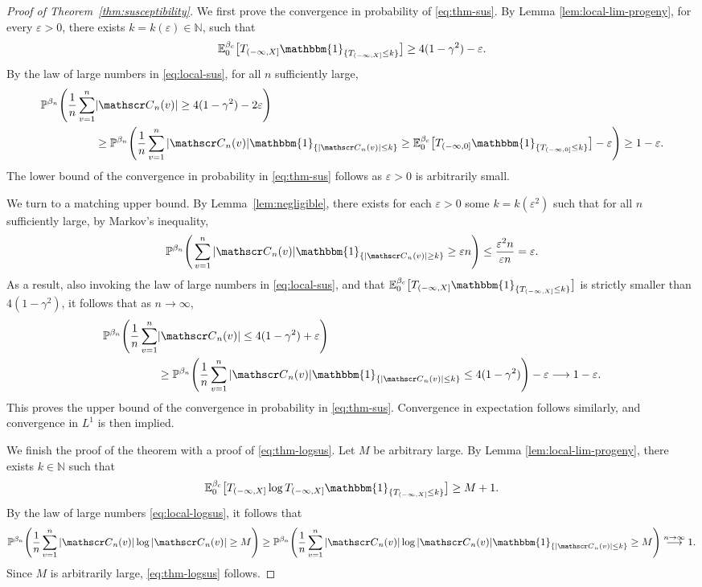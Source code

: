 \documentclass[a4paper, a4wide, 10pt, reqno]{amsart}
\theoremstyle{plain}
\theoremstyle{definition}
\numberwithin{equation}{section}
\newcommand{\N}{{\mathbb N}}
\newcommand{\E}{\mathbb E}
\newcommand{\Prob}{\mathbb{P}}
\newcommand{\sC}{{\mathscr C}}
\newcommand{\ind}[1]{\mathbbm{1}_{\{#1\}}}
\begin{document}
\begin{proof}[Proof of  Theorem~\ref{thm:susceptibility}]
 We first prove the convergence in probability of \eqref{eq:thm-sus}.
 By Lemma \ref{lem:local-lim-progeny},  for every $\varepsilon>0$, there exists $k=k(\varepsilon)\in\N$, such that 
\[
\E^{\beta_c}_{0}\big[T_{(-\infty, X]}\ind{T_{(-\infty, X]}\le k}\big] \ge 4(1-\gamma^2) -\varepsilon.
\]
By the law of large numbers in \eqref{eq:local-sus}, for all $n$ sufficiently large, 
\[
\begin{aligned}
\Prob^{\beta_n}\Bigg(\frac{1}{n}\sum_{v=1}^n&|\sC_n(v)| \ge 4(1-\gamma^2)-2\varepsilon\Bigg)\\ &\ge \Prob^{\beta_n}\Bigg(\frac{1}{n}\sum_{v=1}^n|\sC_n(v)|\ind{|\sC_n(v)|\le k} \ge \E^{\beta_c}_{0}\big[T_{(-\infty, 0]}\ind{T_{(-\infty, 0]}\le k}\big] -\varepsilon\Bigg) \ge 1-\varepsilon.
\end{aligned}
\]
The lower bound of the convergence in probability in \eqref{eq:thm-sus} follows as $\varepsilon>0$ is arbitrarily small. \smallskip

We turn to a matching upper bound. By Lemma~\ref{lem:negligible}, there exists for each $\varepsilon>0$ some $k=k(\varepsilon^2)$ such that for all $n$ sufficiently large, by Markov's inequality,
\[
\Prob^{\beta_n}\Bigg(\sum_{v=1}^n |\sC_{n}(v)|\ind{|\sC_n(v)|\ge k}\ge \varepsilon n\Bigg)\le \frac{\varepsilon^2n}{\varepsilon n}=\varepsilon.
\]
As a result, also invoking the law of large numbers in \eqref{eq:local-sus}, and that $\E^{\beta_c}_{0}\big[T_{(-\infty, X]}\ind{T_{(-\infty, X]}\le k}\big]$ is strictly smaller than $4(1-\gamma^2)$, it follows that as $n\to\infty$,
\begin{align*}
    \Prob^{\beta_n}\Bigg(\frac{1}{n}\sum_{v=1}^n&|\sC_n(v)| \le 4(1-\gamma^2) +\varepsilon\Bigg)\\& \ge \Prob^{\beta_n}\Bigg(\frac{1}{n}\sum_{v=1}^{n}|\sC_n(v)|\ind{|\sC_n(v)|\le k} \le 4(1-\gamma^2)\Bigg) -\varepsilon \longrightarrow 1-\varepsilon.
\end{align*}
This proves the upper bound of the convergence in probability in \eqref{eq:thm-sus}.  Convergence in expectation follows similarly, and convergence in $L^1$ is then implied.

We finish the proof of the theorem with a proof of \eqref{eq:thm-logsus}. Let $M$ be arbitrary large. By Lemma \ref{lem:local-lim-progeny}, there exists $k\in \N$ such that 
\[
\E_{0}^{\beta_c}\big[T_{(-\infty, X]}\log T_{(-\infty, X]}\ind{T_{(-\infty, X]}\le k}\big] \ge M+1.
\]
By the law of large numbers \eqref{eq:local-logsus}, it follows that 
\[
\Prob^{\beta_n}\Bigg(\frac{1}{n}\sum_{v=1}^n|\sC_n(v)|\log|\sC_n(v)| \ge M\Bigg) \ge \Prob^{\beta_n}\Bigg(\frac{1}{n}\sum_{v=1}^n|\sC_n(v)|\log|\sC_n(v)|\ind{|\sC_n(v)|\le k} \ge M\Bigg) \overset{n\to\infty}\longrightarrow 1.
\]
Since $M$ is arbitrarily large, \eqref{eq:thm-logsus} follows.
\end{proof}
\end{document}
